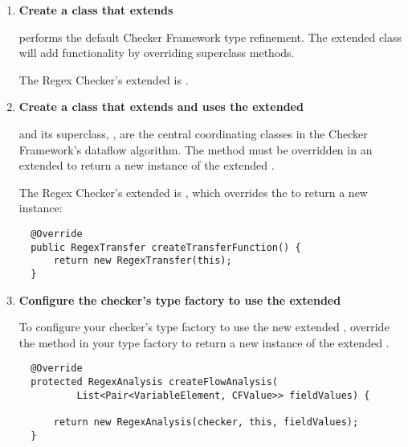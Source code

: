 \begin{enumerate}
\item \textbf{Create a class that extends
    }

   performs the default Checker
  Framework type refinement.  The extended class will add functionality by
  overriding superclass methods.

  The Regex Checker's extended  is
  .

\item \textbf{Create a class that extends
     and uses the extended
    }

   and its superclass,
  , are the central coordinating classes
  in the Checker Framework's dataflow algorithm. The
   method must be overridden in an extended
   to return a new instance of the
  extended .

  The Regex Checker's extended  is
  , which overrides the
   to return a new
   instance:

\begin{smaller}
\begin{Verbatim}
  @Override
  public RegexTransfer createTransferFunction() {
      return new RegexTransfer(this);
  }
\end{Verbatim}
\end{smaller}

\item \textbf{Configure the checker's type factory to use the extended
    }

To configure your checker's type factory to use the new extended
, override the
 method in your type factory to return a new instance
of the extended .

\begin{smaller}
\begin{Verbatim}
  @Override
  protected RegexAnalysis createFlowAnalysis(
          List<Pair<VariableElement, CFValue>> fieldValues) {

      return new RegexAnalysis(checker, this, fieldValues);
  }
\end{Verbatim}
\end{smaller}

\end{enumerate}

